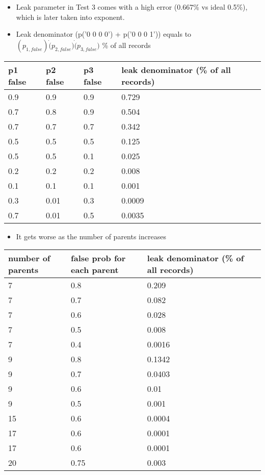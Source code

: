 \documentclass{article}
\begin{document}
\begin{itemize}
	\item Leak parameter in Test 3 comes with a high error (0.667\% vs ideal 0.5\%), which is later taken into exponent.
	\item Leak denominator (p('0 0 0 0') + p('0 0 0 1')) equals to $(p_{1,false})\dot (p_{2,false}) \dot (p_{3,false})$ \% of all records
\end{itemize}

\begin{longtable}{|l|l|l||p{2cm}|}
	\hline
	p1 false & p2 false & p3 false & leak denominator (\% of all records) \\\hline\hline
	0.9 & 0.9 & 0.9 & 0.729 \\\hline
	0.7 & 0.8 & 0.9 & 0.504\\\hline 
	0.7 & 0.7 & 0.7 & 0.342\\\hline 
	0.5 & 0.5 & 0.5 & 0.125\\\hline 
	0.5 & 0.5 & 0.1 & 0.025\\\hline 
	0.2 & 0.2 & 0.2 & 0.008\\\hline
	0.1 & 0.1 & 0.1 & 0.001\\\hline
	0.3 & 0.01 & 0.3 & 0.0009\\\hline
	0.7 & 0.01 & 0.5 & 0.0035 \\\hline
\end{longtable}

\begin{itemize}
	\item It gets worse as the number of parents increases
\end{itemize}

\begin{longtable}{|l|l|l||p{2cm}|}
	\hline
	number of parents & false prob for each parent & leak denominator (\% of all records) \\\hline\hline
	
	7 & 0.8 & 0.209 \\\hline
	7 & 0.7 & 0.082 \\\hline
	7 & 0.6 & 0.028 \\\hline
	7 & 0.5 & 0.008 \\\hline
	7 & 0.4 & 0.0016 \\\hline
	9 & 0.8 & 0.1342 \\\hline
	9 & 0.7 & 0.0403 \\\hline
	9 & 0.6 & 0.01 \\\hline
	9 & 0.5 & 0.001 \\\hline
	15 & 0.6 & 0.0004 \\\hline
	17 & 0.6 & 0.0001 \\\hline
	17 & 0.6 & 0.0001 \\\hline
	20 & 0.75 & 0.003 \\\hline
\end{longtable}
\end{document}
